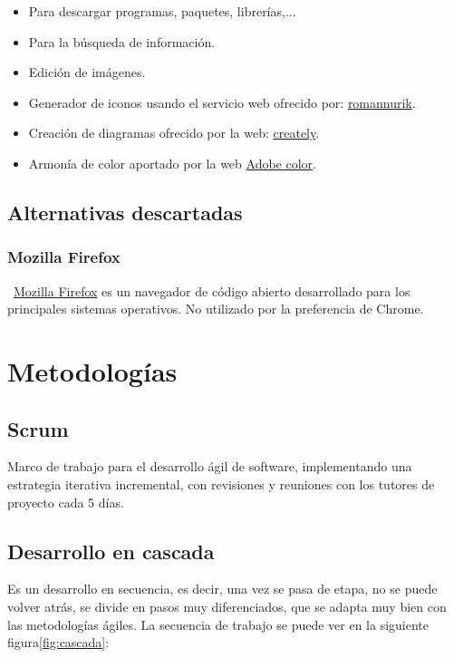 \begin{itemize}
	\item Para descargar programas, paquetes, librerías,...
	\item Para la búsqueda de información.
	\item Edición de imágenes.
	\item Generador de iconos usando el servicio web ofrecido por: \href{https://romannurik.github.io/AndroidAssetStudio}{romannurik}.
	\item Creación de diagramas ofrecido por la web: \href{https://app.creately.com}{creately}.
	\item Armonía de color aportado por la web \href{https://color.adobe.com/es/create/color-wheel}{Adobe color}.
\end{itemize}

\subsection{Alternativas descartadas}

\subsubsection{Mozilla Firefox}\label{mozilla}
~\href{https://www.mozilla.org/es-ES/firefox/new/}{Mozilla Firefox} es un navegador de código abierto desarrollado para los principales sistemas operativos. No utilizado por la preferencia de Chrome.

\section{Metodologías}

\subsection{Scrum}
Marco de trabajo para el desarrollo ágil de software, implementando una estrategia iterativa incremental, con revisiones y reuniones con los tutores de proyecto cada 5 días.

\subsection{Desarrollo en cascada}
Es un desarrollo en secuencia, es decir, una vez se pasa de etapa, no se puede volver atrás, se divide en pasos muy diferenciados, que se adapta muy bien con las metodologías ágiles. La secuencia de trabajo se puede ver en la siguiente figura\ref{fig:cascada}:

